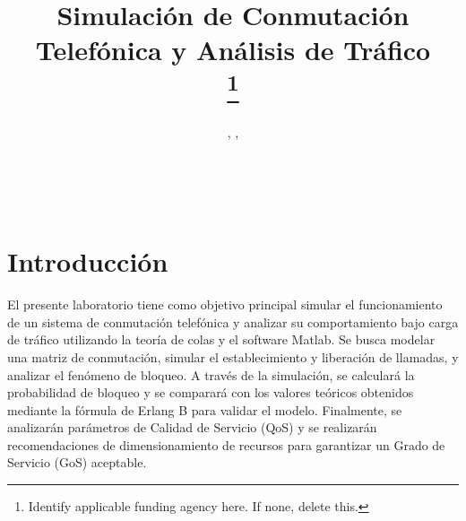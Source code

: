 \documentclass[journal]{IEEEtran} %
\begin{document}
\title{ Simulación de Conmutación Telefónica y Análisis de Tráfico \\
\thanks{Identify applicable funding agency here. If none, delete this.}
}

\author{%
    , %
    , %
    \\%
    \\%
    \\%
    \\%
}

\maketitle



\section{Introducción}
El presente laboratorio tiene como objetivo principal simular el funcionamiento de un sistema de conmutación telefónica y analizar su comportamiento bajo carga de tráfico utilizando la teoría de colas y el software Matlab. Se busca modelar una matriz de conmutación, simular el establecimiento y liberación de llamadas, y analizar el fenómeno de bloqueo. A través de la simulación, se calculará la probabilidad de bloqueo y se comparará con los valores teóricos obtenidos mediante la fórmula de Erlang B para validar el modelo. Finalmente, se analizarán parámetros de Calidad de Servicio (QoS) y se realizarán recomendaciones de dimensionamiento de recursos para garantizar un Grado de Servicio (GoS) aceptable.
\end{document}
